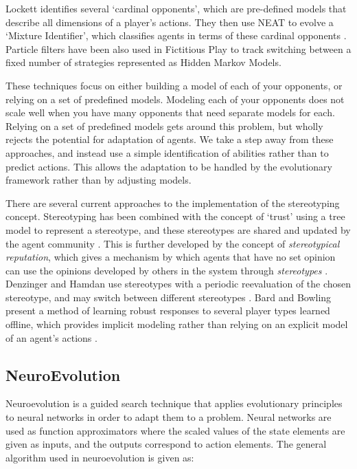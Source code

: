 \documentclass{aamas2014}
\begin{document}
Lockett identifies several `cardinal opponents', which are pre-defined models that describe all dimensions of a player's actions. They then use NEAT to evolve a `Mixture Identifier', which classifies agents in terms of these cardinal opponents \cite{Lockett}. Particle filters have been also used in Fictitious Play to track switching between a fixed number of strategies represented as Hidden Markov Models.

These techniques focus on either building a model of each of your opponents, or relying on a set of predefined models. Modeling each of your opponents does not scale well when you have many opponents that need separate models for each. Relying on a set of predefined models gets around this problem, but wholly rejects the potential for adaptation of agents. We take a step away from these approaches, and instead use a simple identification of abilities rather than to predict actions. This allows the adaptation to be handled by the evolutionary framework rather than by adjusting models.

There are several current approaches to the implementation of the stereotyping concept. Stereotyping has been combined with the concept of `trust' using a tree model to represent a stereotype, and these stereotypes are shared and updated by the agent community \cite{burnett2010bootstrapping}. This is further developed by the concept of \emph{stereotypical reputation}, which gives a mechanism by which agents that have no set opinion can use the opinions developed by others in the system through \emph{stereotypes} \cite{burnett2013stereotypical}. Denzinger and Hamdan use stereotypes with a periodic reevaluation of the chosen stereotype, and may switch between different stereotypes \cite{denzinger2004improving}. Bard and Bowling present a method of learning robust responses to several player types learned offline, which provides implicit modeling rather than relying on an explicit model of an agent's actions .


\subsection{NeuroEvolution}
\label{sec:neuroevo}

Neuroevolution is a guided search technique that applies evolutionary principles to neural networks in order to adapt them to a problem. Neural networks are used as function approximators where the scaled values of the state elements are given as inputs, and the outputs correspond to action elements. The general algorithm used in neuroevolution is given as:
\end{document}
